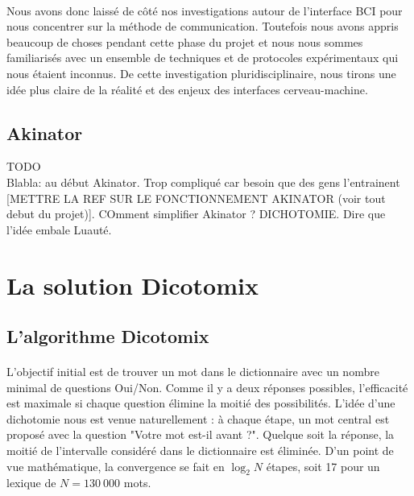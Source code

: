 \documentclass[11pt,a4paper]{article}
\theoremstyle{plain}
\theoremstyle{definition}
\begin{document}
\paragraph{} Nous avons donc laissé de côté nos investigations autour de l'interface BCI pour nous concentrer sur la méthode de communication. Toutefois nous avons appris beaucoup de choses pendant cette phase du projet et nous nous sommes familiarisés avec un ensemble de techniques et de protocoles expérimentaux qui nous étaient inconnus. De cette investigation pluridisciplinaire, nous tirons une idée plus claire de la réalité et des enjeux des interfaces cerveau-machine.

\subsection{Akinator}

TODO\\

Blabla: au début Akinator. Trop compliqué car besoin que des gens l'entrainent [METTRE LA REF SUR LE FONCTIONNEMENT AKINATOR (voir tout debut du projet)]. 
COmment simplifier Akinator ? DICHOTOMIE. Dire que l'idée embale Luauté.


\section{La solution Dicotomix}
 
\subsection{L'algorithme Dicotomix}
\paragraph{} L'objectif initial est de trouver un mot dans le dictionnaire avec un nombre minimal de questions Oui/Non. Comme il y a deux réponses possibles, l'efficacité est maximale si chaque question élimine la moitié des possibilités. L'idée d'une dichotomie nous est venue naturellement : à chaque étape, un mot central est proposé avec la question "Votre mot est-il avant ?". Quelque soit la réponse, la moitié de l'intervalle considéré dans le dictionnaire est éliminée. D'un point de vue mathématique, la convergence se fait en $\log_2N$ étapes, soit 17 pour un lexique de $N=130\ 000$ mots.
\end{document}
